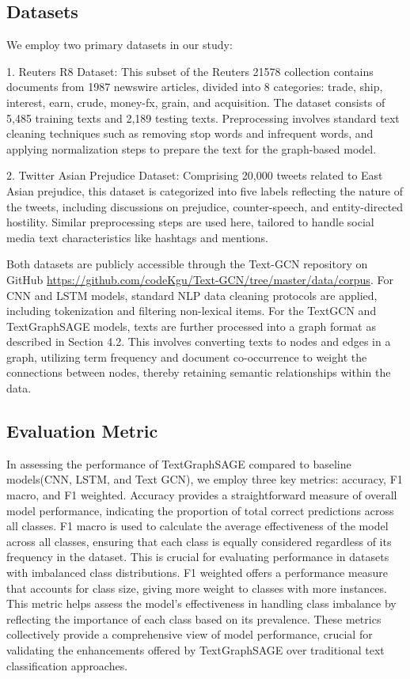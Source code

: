 \documentclass{article}
\begin{document}
\subsection{Datasets} 

We employ two primary datasets in our study:

1. Reuters R8 Dataset\cite{r8}: This subset of the Reuters 21578 collection contains documents from 1987 newswire articles, divided into 8 categories: trade, ship, interest, earn, crude, money-fx, grain, and acquisition. The dataset consists of 5,485 training texts and 2,189 testing texts. Preprocessing involves standard text cleaning techniques such as removing stop words and infrequent words, and applying normalization steps to prepare the text for the graph-based model.

2. Twitter Asian Prejudice Dataset\cite{vidgen2020detecting}: Comprising 20,000 tweets related to East Asian prejudice, this dataset is categorized into five labels reflecting the nature of the tweets, including discussions on prejudice, counter-speech, and entity-directed hostility. Similar preprocessing steps are used here, tailored to handle social media text characteristics like hashtags and mentions.

Both datasets are publicly accessible through the Text-GCN repository on GitHub \href{https://github.com/codeKgu/Text-GCN/tree/master/data/corpus}{https://github.com/codeKgu/Text-GCN/tree/master/data/corpus}. For CNN and LSTM models, standard NLP data cleaning protocols are applied, including tokenization and filtering non-lexical items. For the TextGCN and TextGraphSAGE models, texts are further processed into a graph format as described in Section 4.2. This involves converting texts to nodes and edges in a graph, utilizing term frequency and document co-occurrence to weight the connections between nodes, thereby retaining semantic relationships within the data.


\subsection{Evaluation Metric}

In assessing the performance of TextGraphSAGE compared to baseline models(CNN, LSTM, and Text GCN), we employ three key metrics: accuracy, F1 macro, and F1 weighted. Accuracy provides a straightforward measure of overall model performance, indicating the proportion of total correct predictions across all classes. F1 macro is used to calculate the average effectiveness of the model across all classes, ensuring that each class is equally considered regardless of its frequency in the dataset. This is crucial for evaluating performance in datasets with imbalanced class distributions. F1 weighted offers a performance measure that accounts for class size, giving more weight to classes with more instances. This metric helps assess the model's effectiveness in handling class imbalance by reflecting the importance of each class based on its prevalence. These metrics collectively provide a comprehensive view of model performance, crucial for validating the enhancements offered by TextGraphSAGE over traditional text classification approaches.
\end{document}
